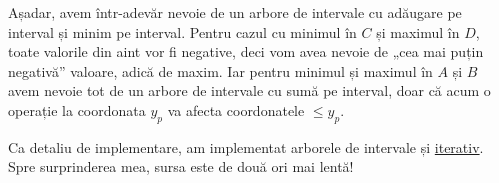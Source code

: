 Așadar, avem într-adevăr nevoie de un arbore de intervale cu adăugare pe interval și minim pe interval. Pentru cazul cu minimul în $C$ și maximul în $D$, toate valorile din aint vor fi negative, deci vom avea nevoie de „cea mai puțin negativă” valoare, adică de maxim. Iar pentru minimul și maximul în $A$ și $B$ avem nevoie tot de un arbore de intervale cu sumă pe interval, doar că acum o operație la coordonata $y_p$ va afecta coordonatele $\leq y_p$.

Ca detaliu de implementare, am implementat arborele de intervale și \href{https://kilonova.ro/submissions/376728}{iterativ}. Spre surprinderea mea, sursa este de două ori mai lentă!

